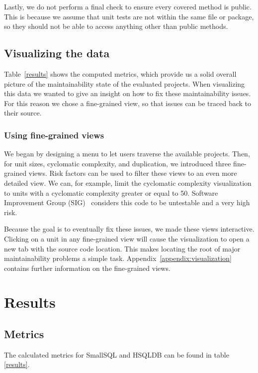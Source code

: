 \documentclass{article}
\begin{document}
Lastly, we do not perform a final check to ensure every covered method is public. This is because we assume that unit tests are not within the same file or package, so they should not be able to access anything other than public methods.

\subsection{Visualizing the data}

Table~\ref{results} shows the computed metrics, which provide us a solid overall picture of the maintainability state of the evaluated projects.
When visualizing this data we wanted to give an insight on how to fix these maintainability issues. 
For this reason we chose a fine-grained view, so that issues can be traced back to their source.

\subsubsection{Using fine-grained views}
We began by designing a menu to let users traverse the available projects.
Then, for unit sizes, cyclomatic complexity, and duplication, we introduced three fine-grained views.
Risk factors can be used to filter these views to an even more detailed view.
We can, for example, limit the cyclomatic complexity visualization to units with a cyclomatic complexity greater or equal to 50.
Software Improvement Group (SIG)~\cite{SIG} considers this code to be untestable and a very high risk.

Because the goal is to eventually fix these issues, we made these views interactive.
Clicking on a unit in any fine-grained view will cause the visualization to open a new tab with the source code location.
This makes locating the root of major maintainability problems a simple task.
Appendix~\ref{appendix:visualization} contains further information on the fine-grained views.

\section{Results}

\subsection{Metrics}
The calculated metrics for SmallSQL and HSQLDB can be found in table \ref{results}.
\end{document}

